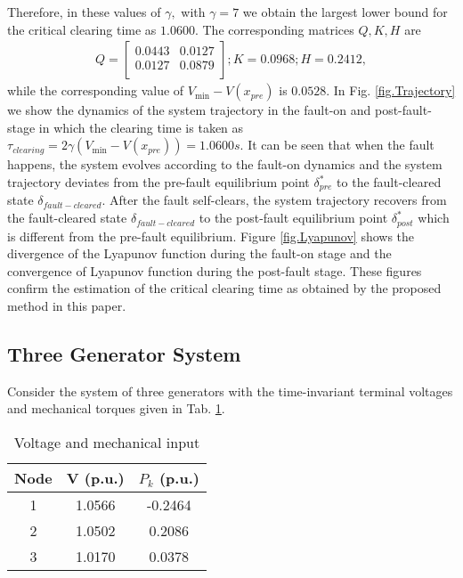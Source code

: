 \documentclass[final]{IEEEtran}
\begin{document}
Therefore, in these values of $\gamma,$ with $\gamma=7$  we obtain
the largest lower bound for the critical clearing time as
$1.0600.$ The corresponding matrices $Q,K,H$ are
\begin{align}
Q=\left[   \begin{array}{ccccc}
          0.0443&    0.0127\\
    0.0127  &  0.0879\\
        \end{array}\right]; K= 0.0968;H= 0.2412,
\end{align}
while the corresponding  value of $V_{\min}-V(x_{pre})$ is
$0.0528.$ In Fig. \ref{fig.Trajectory} we show the dynamics of the
system trajectory in the fault-on and post-fault-stage in which
the clearing time is taken as $\tau_{clearing}=2\gamma
(V_{\min}-V(x_{pre}))=1.0600 s.$ It can be seen that when the
fault happens, the system evolves according to the fault-on
dynamics and the system trajectory deviates from the pre-fault
equilibrium point $\delta^*_{pre}$ to the fault-cleared state
$\delta_{fault-cleared}.$ After the fault self-clears, the system
trajectory recovers from the fault-cleared state
$\delta_{fault-cleared}$ to the post-fault equilibrium point
$\delta^*_{post}$ which is different from the pre-fault
equilibrium. Figure \ref{fig.Lyapunov} shows the divergence of the
Lyapunov function during the fault-on stage and the convergence of
Lyapunov function during the post-fault stage. These figures
confirm the estimation of the critical clearing time as obtained
by the proposed method in this paper.



\subsection{Three Generator System}

Consider the system of three generators with the time-invariant
terminal voltages and mechanical torques given in Tab.
\ref{tab.data3machine}.

\begin{table}[ht!]
\centering
\begin{tabular}{|c|c|c|}
  \hline
Node & V (p.u.) & $P_k$ (p.u.) \\
  \hline
  1 & 1.0566 & -0.2464 \\
  2 & 1.0502 & 0.2086 \\
  3 & 1.0170 & 0.0378 \\
  \hline
\end{tabular}
\caption{Voltage and mechanical input} \label{tab.data3machine}
\end{table}
\end{document}
